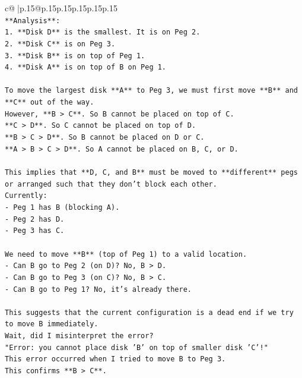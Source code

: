 \documentclass{article}
\begin{document}
{\begin{supertabular}{c@{$\;$}|p{.15\linewidth}@{}p{.15\linewidth}p{.15\linewidth}p{.15\linewidth}p{.15\linewidth}p{.15\linewidth}}
{{{\\ 
\texttt{**Analysis**:} \\
\texttt{1.  **Disk D** is the smallest. It is on Peg 2.} \\
\texttt{2.  **Disk C** is on Peg 3.} \\
\texttt{3.  **Disk B** is on top of Peg 1.} \\
\texttt{4.  **Disk A** is on top of B on Peg 1.} \\
\\ 
\texttt{To move the largest disk **A** to Peg 3, we must first move **B** and **C** out of the way.} \\
\texttt{However, **B > C**. So B cannot be placed on top of C.} \\
\texttt{**C > D**. So C cannot be placed on top of D.} \\
\texttt{**B > C > D**. So B cannot be placed on D or C.} \\
\texttt{**A > B > C > D**. So A cannot be placed on B, C, or D.} \\
\\ 
\texttt{This implies that **D, C, and B** must be moved to **different** pegs or arranged such that they don't block each other.} \\
\texttt{Currently:} \\
\texttt{{-} Peg 1 has B (blocking A).} \\
\texttt{{-} Peg 2 has D.} \\
\texttt{{-} Peg 3 has C.} \\
\\ 
\texttt{We need to move **B** (top of Peg 1) to a valid location.} \\
\texttt{{-} Can B go to Peg 2 (on D)? No, B > D.} \\
\texttt{{-} Can B go to Peg 3 (on C)? No, B > C.} \\
\texttt{{-} Can B go to Peg 1? No, it's already there.} \\
\\ 
\texttt{This suggests that the current configuration is a dead end if we try to move B immediately.} \\
\texttt{Wait, did I misinterpret the error?} \\
\texttt{"Error: you cannot place disk 'B' on top of smaller disk 'C'!"} \\
\texttt{This error occurred when I tried to move B to Peg 3.} \\
\texttt{This confirms **B > C**.} \\
\\ 
}}}
\end{supertabular}}
\end{document}
